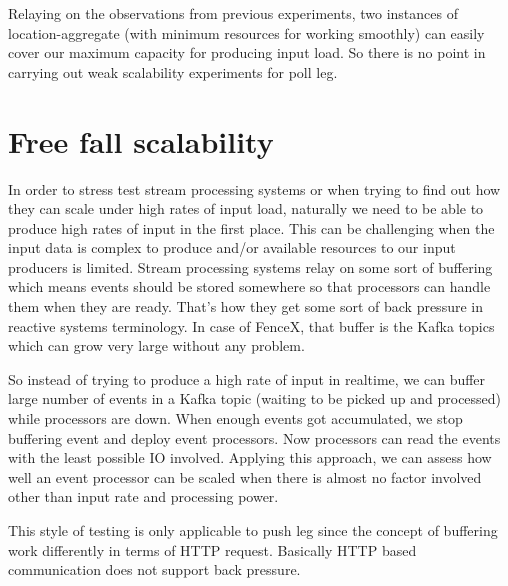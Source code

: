 \documentclass[a4]{report}
\begin{document}
    Relaying on the observations from previous experiments, two instances of location-aggregate (with minimum
    resources for working smoothly) can easily cover our maximum capacity for producing input load.
    So there is no point in carrying out weak scalability experiments for poll leg.


    \section{Free fall scalability}
    In order to stress test stream processing systems or when trying to find out how they can scale under high rates
    of input load, naturally we need to be able to produce high rates of input in the first place.
    This can be challenging when the input data is complex to produce and/or available resources to our input
    producers is limited.
    Stream processing systems relay on some sort of buffering which means events should be stored somewhere so
    that processors can handle them when they are ready.
    That's how they get some sort of back pressure in reactive systems terminology.
    In case of FenceX, that buffer is the Kafka topics which can grow very large without any problem.

    So instead of trying to produce a high rate of input in realtime, we can buffer large number of events in a Kafka
    topic (waiting to be picked up and processed) while processors are down.
    When enough events got accumulated, we stop buffering event and deploy event processors.
    Now processors can read the events with the least possible IO involved.
    Applying this approach, we can assess how well an event processor can be scaled when there is almost no factor
    involved other than input rate and processing power.

    This style of testing is only applicable to push leg since the concept of buffering work differently in terms of
    HTTP request.
    Basically HTTP based communication does not support back pressure.
\end{document}
